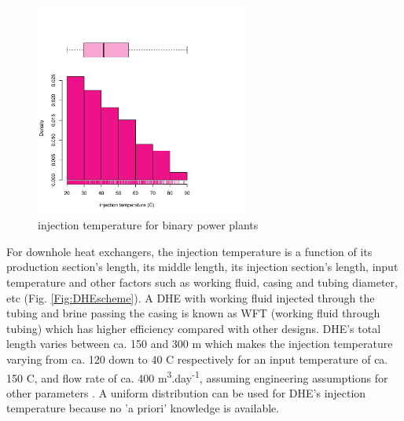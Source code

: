 \documentclass[review,authoryear, 12pt]{elsarticle}\usepackage[]{graphicx}\usepackage[]{color}
\newenvironment{knitrout}{}{} %
\begin{document}
\begin{knitrout}
\color{fgcolor}\begin{figure}[]


{\centering \includegraphics[width=7cm,height=7cm]{figure/injectionTemp} 

}

\caption[injection temperature for binary power plants]{injection temperature for binary power plants\label{Fig:injectionTemp}}
\end{figure}


\end{knitrout}

For downhole heat exchangers, the injection temperature is a function of  its production section's length, its middle length, its injection section's length, input temperature and other factors such as working fluid, casing and tubing diameter, etc (Fig. \ref{Fig:DHEscheme}). A DHE with working fluid injected through the tubing and brine passing the casing is known as WFT (working fluid through tubing) which has higher efficiency compared with other designs. DHE's total length varies between ca. 150 and 300 m which makes the injection temperature varying from ca. 120 down to 40 C respectively for an input temperature of ca. 150 C, and flow rate of ca. 400 m\textsuperscript{3}.day\textsuperscript{-1}, assuming engineering assumptions for other parameters \citep{feng2012numerical}. A uniform distribution can be used for DHE's injection temperature because no 'a priori' knowledge is available. 
\end{document}
